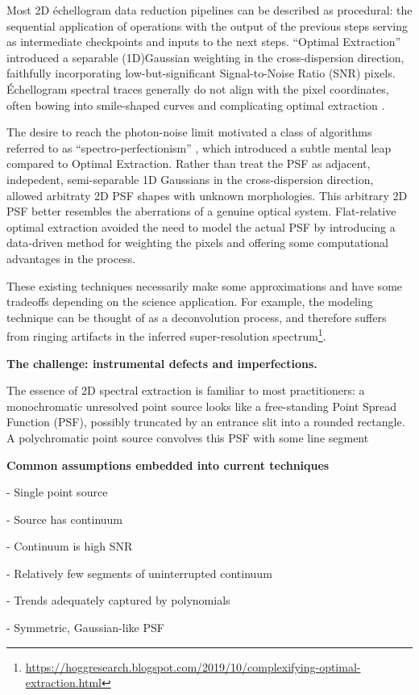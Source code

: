 \documentclass[twocolumn]{aastex63}
\begin{document}
Most 2D \'echellogram data reduction pipelines can be described as procedural: the sequential application of operations with the output of the previous steps serving as intermediate checkpoints and inputs to the next steps.  ``Optimal Extraction'' \citep{1986PASP...98..609H} introduced a separable (1D)Gaussian weighting in the cross-dispersion direction, faithfully incorporating low-but-significant Signal-to-Noise Ratio (SNR) pixels.  \'Echellogram spectral traces generally do not align with the pixel coordinates, often bowing into smile-shaped curves and complicating optimal extraction \citep{2002A&A...385.1095P,2020arXiv200805827P}.

The desire to reach the photon-noise limit motivated a class of algorithms referred to as ``spectro-perfectionism'' \citep{2010PASP..122..248B}, which introduced a subtle mental leap compared to Optimal Extraction.  Rather than treat the PSF as adjacent, indepedent, semi-separable 1D Gaussians in the cross-dispersion direction, \citet{2010PASP..122..248B} allowed arbitraty 2D PSF shapes with unknown morphologies. This arbitrary 2D PSF better resembles the aberrations of a genuine optical system.  Flat-relative optimal extraction \citep{2014A&A...561A..59Z} avoided the need to model the actual PSF by introducing a data-driven method for weighting the pixels and offering some computational advantages in the process.

These existing techniques necessarily make some approximations and have some tradeoffs depending on the science application.  For example, the \citet{2010PASP..122..248B} modeling technique can be thought of as a deconvolution process, and therefore suffers from ringing artifacts in the inferred super-resolution spectrum\footnote{\url{https://hoggresearch.blogspot.com/2019/10/complexifying-optimal-extraction.html}}.




\textbf{The challenge: instrumental defects and imperfections.}

The essence of 2D spectral extraction is familiar to most practitioners: a monochromatic unresolved point source looks like a free-standing Point Spread Function (PSF), possibly truncated by an entrance slit into a rounded rectangle.  A polychromatic point source convolves this PSF with some line segment

\begin{mdframed}
  \textbf{Common assumptions embedded into current techniques} \par
  - Single point source\par
  - Source has continuum\par
  - Continuum is high SNR\par
  - Relatively few segments of uninterrupted continuum\par
  - Trends adequately captured by polynomials\par
  - Symmetric, Gaussian-like PSF\par
\end{mdframed}
\end{document}
